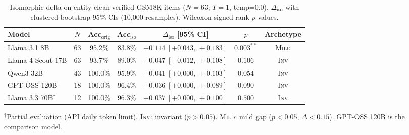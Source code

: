 \begin{table}[t]
\centering
\small
\caption{Isomorphic delta on entity-clean verified GSM8K items ($N=63$; $T=1$, temp=0.0). $\Delta_{\mathrm{iso}}$ with clustered bootstrap 95\% CIs (10{,}000 resamples). Wilcoxon signed-rank $p$-values.}
\label{tab:main}
\begin{tabular}{lcccccc}
\toprule
Model & $N$ & Acc$_{\mathrm{orig}}$ & Acc$_{\mathrm{iso}}$ & $\Delta_{\mathrm{iso}}$ [95\% CI] & $p$ & Archetype \\
\midrule
Llama 3.1 8B & 63 & 95.2\% & 83.8\% & $+0.114\;[+0.043,\,+0.183]$ & $0.003^{**}$ & \textsc{Mild} \\
Llama 4 Scout 17B & 63 & 93.7\% & 89.0\% & $+0.047\;[-0.012,\,+0.108]$ & $0.106$ & \textsc{Inv} \\
Qwen3 32B$^\dagger$ & 43 & 100.0\% & 95.9\% & $+0.041\;[+0.000,\,+0.103]$ & $0.054$ & \textsc{Inv} \\
GPT-OSS 120B$^\dagger$ & 18 & 100.0\% & 96.4\% & $+0.036\;[+0.000,\,+0.089]$ & $0.090$ & \textsc{Inv} \\
Llama 3.3 70B$^\dagger$ & 12 & 100.0\% & 96.3\% & $+0.037\;[+0.000,\,+0.100]$ & $0.500$ & \textsc{Inv} \\
\bottomrule
\end{tabular}
\vspace{1mm}
{\footnotesize $^\dagger$Partial evaluation (API daily token limit). \textsc{Inv}: invariant ($p > 0.05$). \textsc{Mild}: mild gap ($p < 0.05$, $\Delta < 0.15$). GPT-OSS 120B is the comparison model.}
\end{table}
